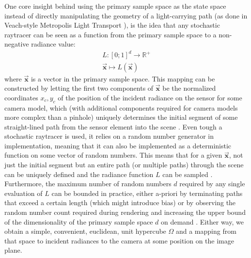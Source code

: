 \documentclass[oneside, a4paper]{article}
\newcommand\vek[1]{\vec{\bm{#1}}}
\begin{document}
One core insight behind using the primary sample space as the state space instead of directly manipulating the geometry of a light-carrying path (as done in Veach-style Metropolis Light Transport \autocite{veach-guibas-mlt}), is the idea that any stochastic raytracer can be seen as a function from the primary sample space to a non-negative radiance value:
\begin{align*}
  L: [0;1]^d \to \mathds{R}^+\\
   \vek{x} \mapsto L(\vek{x})
\end{align*}
where $\vek{x}$ is a vector in the primary sample space. This mapping can be constructed by letting the first two components of $\vek{x}$ be the normalized coordinates $x_c, y_c$ of the position of the incident radiance on the sensor for some camera model, which (with additional components required for camera models more complex than a pinhole) uniquely determines the initial segment of some straight-lined path from the sensor element into the scene \autocite{pbrt}. Even tough a stochastic raytracer is used, it relies on a random number generator in implementation, meaning that it can also be implemented as a deterministic function on some vector of random numbers. This means that for a given $\vek{x}$, not just the initial segment but an entire path (or multiple paths) through the scene can be uniquely defined and the radiance function $L$ can be sampled \autocite{pbrt}. Furthermore, the maximum number of random numbers $d$ required by any single evaluation of $L$ can be bounded in practice, either a-priori by terminating paths that exceed a certain length (which might introduce bias) or by observing the random number count required during rendering and increasing the upper bound of the dimensionality of the primary sample space $d$ on demand \autocite{pbrt}. Either way, we obtain a simple, convenient, euclidean, unit hypercube $\Omega$ and a mapping from that space to incident radiances to the camera at some position on the image plane.
\end{document}
